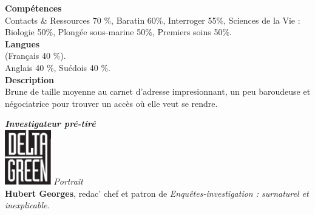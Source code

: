 \documentclass[11pt,twoside,a4paper]{article}
\begin{document}
\begin{multicols}{3}
	\textbf{Comp{\'e}tences}~\\
		Contacts \& Ressources 70 \%, 
		Baratin 60\%, 
		Interroger 55\%, 
		Sciences de la Vie : Biologie 50\%, 
		Plong{\'e}e sous-marine 50\%, 
		Premiers soins 50\%. ~\\

	\textbf{Langues}~\\
	(Fran\c{c}ais 40 \%). ~\\
	Anglais 40 \%, Su{\'e}dois 40 \%. ~\\

	\textbf{Description}~\\
	Brune de taille moyenne au carnet d'adresse impresionnant, un peu baroudeuse et n{\'e}gociatrice pour trouver un acc{\`e}s o{\`u} elle veut se rendre. ~\\

	

	\vfill
	\columnbreak

	\textbf{\emph{Investigateur pr{\'e}-tir{\'e}}}~\\

	\includegraphics[width=0.15\textwidth]{DeltaGreenLogo.png} \emph{Portrait}~\\
	
	\textbf{\Large Hubert Georges}, redac' chef et patron de  \emph{Enqu{\^e}tes-investigation : surnaturel et inexplicable}. ~\\


\end{multicols}
\end{document}
